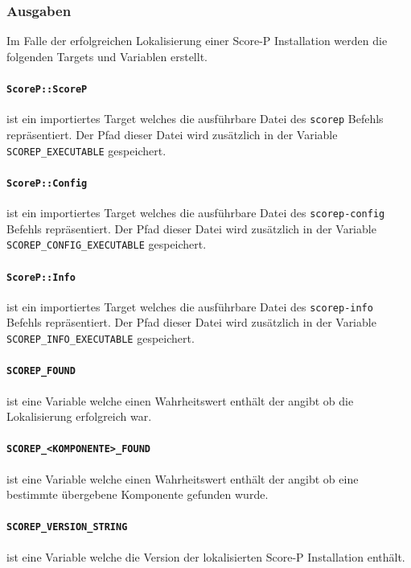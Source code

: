 \documentclass[german,proseminar,hyperref,utf8,lof]{zihpub}
\begin{document}
    \subsubsection{Ausgaben}
    Im Falle der erfolgreichen Lokalisierung einer Score-P Installation werden die folgenden
    Targets und Variablen erstellt.

    \paragraph{\texttt{ScoreP::ScoreP}} ist ein importiertes Target welches die ausführbare Datei
    des \texttt{scorep} Befehls repräsentiert.
    Der Pfad dieser Datei wird zusätzlich in der Variable \texttt{SCOREP\_EXECUTABLE} gespeichert.

    \paragraph{\texttt{ScoreP::Config}} ist ein importiertes Target welches die ausführbare Datei
    des \texttt{scorep-config} Befehls repräsentiert.
    Der Pfad dieser Datei wird zusätzlich in der Variable \\ \texttt{SCOREP\_CONFIG\_EXECUTABLE} gespeichert.

    \paragraph{\texttt{ScoreP::Info}} ist ein importiertes Target welches die ausführbare Datei
    des \texttt{scorep-info} Befehls repräsentiert.
    Der Pfad dieser Datei wird zusätzlich in der Variable \texttt{SCOREP\_INFO\_EXECUTABLE} gespeichert.

    \paragraph{\texttt{SCOREP\_FOUND}} ist eine Variable welche einen Wahrheitswert enthält der angibt
    ob die Lokalisierung erfolgreich war.

    \paragraph{\texttt{SCOREP\_<KOMPONENTE>\_FOUND}} ist eine Variable welche einen Wahrheitswert enthält
    der angibt ob eine bestimmte übergebene Komponente gefunden wurde.

    \paragraph{\texttt{SCOREP\_VERSION\_STRING}} ist eine Variable welche die Version der lokalisierten
    Score-P Installation enthält.
\end{document}
